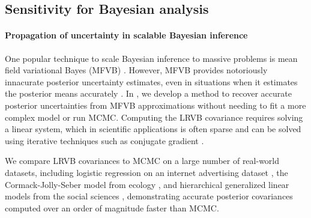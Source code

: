 


\subsection*{Sensitivity for Bayesian analysis}


\paragraph{Propagation of uncertainty in scalable Bayesian inference}

One popular technique to scale Bayesian inference to massive problems is mean
field variational Bayes (MFVB) \citep{wainwright:2008:graphical,
blei:2017:variational, regier:2019:cataloging}.  However, MFVB provides
notoriously innacurate posterior uncertainty estimates, even in situations when
it estimates the posterior means accurately \citep{turner:2011:two}. In
\citet{giordano:2018:covariances}, we develop a method to recover accurate
posterior uncertainties from MFVB approximations without needing to fit a more
complex model or run MCMC. Computing the LRVB covariance requires solving a
linear system, which in scientific applications is often sparse and can be
solved using iterative techniques such as conjugate gradient \citep[Chapter
5]{nocedal:2006:numerical}.

We compare LRVB covariances to MCMC on a large number of real-world datasets,
including logistic regression on an internet advertising dataset
\citep{criteo:2014:dataset}, the Cormack-Jolly-Seber model from ecology
\citep{kery:2011:bayesian}, and hierarchical generalized linear models from the
social sciences \citep{gelman:2006:arm}, demonstrating accurate posterior
covariances computed over an order of magnitude faster than MCMC.


